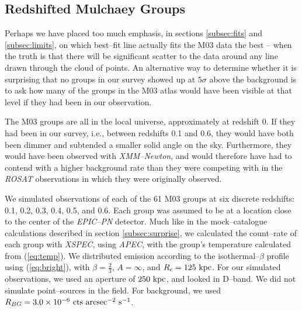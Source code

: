 \documentclass[12pt,preprint]{aastex}
\begin{document}
\subsection{Redshifted Mulchaey Groups}
\label{subsec:M03z}
Perhaps we have placed too much emphasis, in sections \ref{subsec:fits} and
\ref{subsec:limits}, on which best--fit line actually fits
the M03 data the best -- when the truth is that there will be significant
scatter to the data around any line drawn through the cloud of points.
An alternative way to determine whether it is surprising that no groups in
our survey showed up at $5\sigma$ above the background is to ask how many of the
groups in the M03 atlas would have been visible at that level if they had
been in our observation.

The M03 groups are all in the local universe, approximately at redshift 0.
If they had been in our
survey, i.e., between redshifts 0.1 and 0.6, they would have both been dimmer
and subtended a smaller solid angle on the sky.  Furthermore, they would have
been observed with \textsl{XMM--Newton}, and would therefore have had to contend
with a higher background rate than they were competing with in the
\textsl{ROSAT} observations in which they were originally observed.

We simulated observations of each of the 61 M03 groups at six discrete
redshifts: 0.1, 0.2, 0.3, 0.4, 0.5, and 0.6.  Each group was assumed to be
at a location close to the center of the \textsl{EPIC--PN} detector.
Much like in the mock--catalogue calculations described in
section \ref{subsec:surprise}, we calculated the count--rate of each group
with \textsl{XSPEC}, using \textsl{APEC}, with the group's temperature
calculated from (\ref{eq:temp}).  We distributed emission according to the
isothermal--$\beta$ profile using (\ref{eq:bright}), with
$\beta=\frac{2}{3}$, $A = \infty$,
and $R_c = 125 {\rm~kpc}$.  For our simulated observations, we used an aperture
of $250 {\rm~kpc}$, and looked in D--band.  We did not simulate point--sources
in the field.  For background, we used
$R_{BG} = 3.0\times10^{-6} {\rm~cts~arcsec^{-2}~s^{-1}}$.
\end{document}

